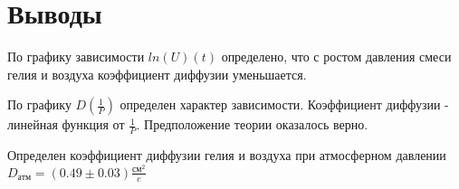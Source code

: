 \section{Выводы}

     По графику зависимости $ln(U)(t)$ определено, что с ростом давления смеси гелия и воздуха коэффициент диффузии уменьшается. 

     
     По графику $D(\frac{1}{P})$ определен характер зависимости. Коэффициент диффузии - линейная функция от $\frac{1}{P}$. Предположение теории оказалось верно.

     
     Определен коэффициент диффузии гелия и воздуха при атмосферном давлении $D_{\text{атм}} = (0.49 \pm 0.03)\frac{\text{см}^2}{c}$

